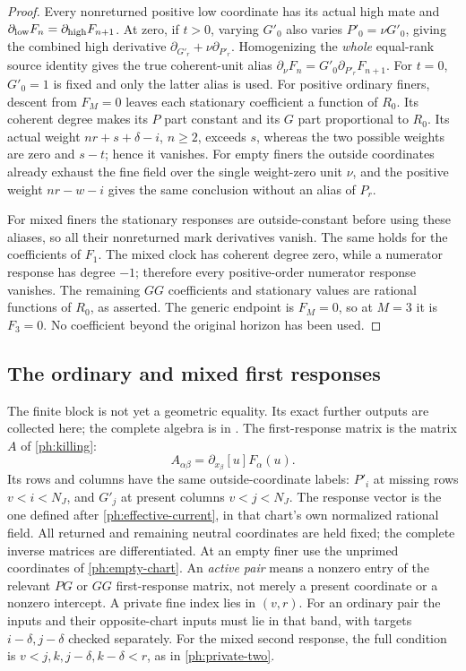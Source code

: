 \documentclass[11pt,a4paper]{amsart}
\numberwithin{equation}{section}
\theoremstyle{plain}
\theoremstyle{definition}
\begin{document}
\begin{proof}
Every nonreturned positive low coordinate has its actual high mate and
\(\partial_{\rm low}F_n=\partial_{\rm high}F_{n+1}\).
At zero, if \(t>0\), varying \(G'_0\) also varies
\(P'_0=\nu G'_0\), giving the combined high derivative
\(\partial_{G'_r}+\nu\partial_{P'_r}\).
Homogenizing the \emph{whole} equal-rank source identity gives the true
coherent-unit alias
\(\partial_\nu F_n=G'_0\partial_{P'_r}F_{n+1}\).
For \(t=0\), \(G'_0=1\) is fixed and only the latter alias is used.
For positive ordinary finers, descent from \(F_M=0\) leaves each
stationary coefficient a function of \(R_0\).  Its coherent degree makes
its \(P\) part constant and its \(G\) part proportional to \(R_0\).
Its actual weight \(nr+s+\delta-i\), \(n\ge2\), exceeds \(s\),
whereas the two possible weights are zero and \(s-t\); hence it vanishes.
For empty finers the outside coordinates already exhaust the fine field
over the single weight-zero unit \(\nu\), and the positive weight
\(nr-w-i\) gives the same conclusion without an alias of \(P_r\).

For mixed finers the stationary responses are outside-constant before
using these aliases, so all their nonreturned mark derivatives vanish.
The same holds for the coefficients of \(F_1\).  The mixed clock has
coherent degree zero, while a numerator response has degree \(-1\);
therefore every positive-order numerator response vanishes.  The
remaining \(GG\) coefficients and stationary values are rational
functions of \(R_0\), as asserted.  The generic endpoint is \(F_M=0\),
so at \(M=3\) it is \(F_3=0\).  No coefficient beyond the original
horizon has been used.
\end{proof}

\subsection{The ordinary and mixed first responses}
The finite block is not yet a geometric equality.  Its exact further
outputs are collected here; the complete algebra is in
.
The first-response matrix is the matrix \(A\) of \eqref{ph:killing}:
\[
 A_{\alpha\beta}=\partial_{x_\beta}[u]F_\alpha(u).
\]
Its rows and columns have the same outside-coordinate labels:
\(P'_i\) at missing rows \(v<i<N_J\), and \(G'_j\) at present
columns \(v<j<N_J\).  The response vector is the one defined after
\eqref{ph:effective-current}, in that chart's own normalized rational
field.  All returned and remaining neutral coordinates are held fixed;
the complete inverse matrices are differentiated.  At an empty finer
use the unprimed coordinates of \eqref{ph:empty-chart}.
An \emph{active pair} means a nonzero entry of the relevant \(PG\) or
\(GG\) first-response matrix, not merely a present coordinate or a
nonzero intercept.  A private fine index lies in \((v,r)\).
For an ordinary pair the inputs and their opposite-chart inputs must
lie in that band, with targets \(i-\delta,j-\delta\) checked separately.
For the mixed second response, the full condition is
\(v<j,k,j-\delta,k-\delta<r\), as in \eqref{ph:private-two}.
\end{document}
